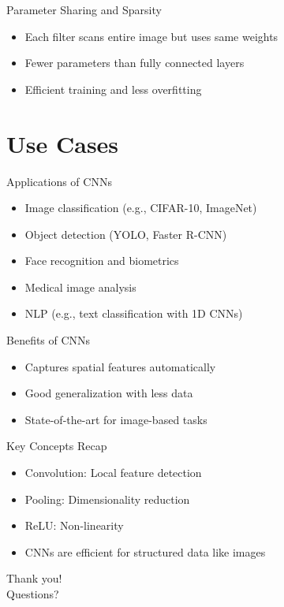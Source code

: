\documentclass{beamer}
\begin{document}
\begin{frame}{Parameter Sharing and Sparsity}
\begin{itemize}
    \item Each filter scans entire image but uses same weights
    \item Fewer parameters than fully connected layers
    \item Efficient training and less overfitting
\end{itemize}
\end{frame}

\section{Use Cases}
\begin{frame}{Applications of CNNs}
\begin{itemize}
    \item Image classification (e.g., CIFAR-10, ImageNet)
    \item Object detection (YOLO, Faster R-CNN)
    \item Face recognition and biometrics
    \item Medical image analysis
    \item NLP (e.g., text classification with 1D CNNs)
\end{itemize}
\end{frame}

\begin{frame}{Benefits of CNNs}
\begin{itemize}
    \item Captures spatial features automatically
    \item Good generalization with less data
    \item State-of-the-art for image-based tasks
\end{itemize}
\end{frame}

\begin{frame}{Key Concepts Recap}
\begin{itemize}
    \item Convolution: Local feature detection
    \item Pooling: Dimensionality reduction
    \item ReLU: Non-linearity
    \item CNNs are efficient for structured data like images
\end{itemize}
\end{frame}

\begin{frame}[standout]
    Thank you! \\
    Questions?
\end{frame}
\end{document}
